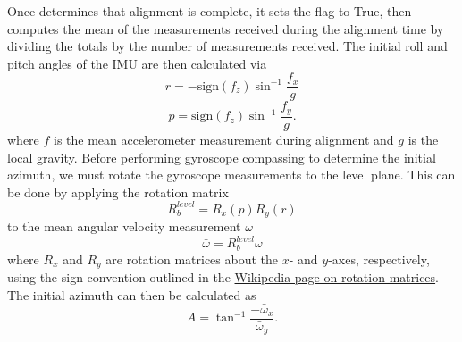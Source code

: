 \documentclass[11pt, oneside]{article}   	%
\begin{document}
Once  determines that alignment is complete, it sets the  flag to True, then computes the mean of the measurements received during the alignment time by dividing the totals by the number of measurements received.  The initial roll and pitch angles of the IMU are then calculated via
\begin{equation}
r=-\textrm{sign}(f_z)\sin^{-1}\frac{f_x}{g}
\end{equation}
\begin{equation}
p=\textrm{sign}(f_z)\sin^{-1}\frac{f_y}{g}.
\end{equation}
where $f$ is the mean accelerometer measurement during alignment and $g$ is the local gravity.  Before performing gyroscope compassing to determine the initial azimuth, we must rotate the gyroscope measurements to the level plane.  This can be done by applying the rotation matrix
\begin{equation}
R_b^{level}=R_x(p)R_y(r)
\end{equation}
to the mean angular velocity measurement $\omega$
\begin{equation}
\bar \omega=R_b^{level}\omega
\end{equation}
where $R_x$ and $R_y$ are rotation matrices about the $x$- and $y$-axes, respectively, using the sign convention outlined in the \href{https://en.wikipedia.org/wiki/Rotation_matrix}{Wikipedia page on rotation matrices}. 
The initial azimuth can then be calculated as 
\begin{equation}
A=\tan^{-1}\frac{-\bar\omega_x}{\bar\omega_y}.
\end{equation}
\end{document}
